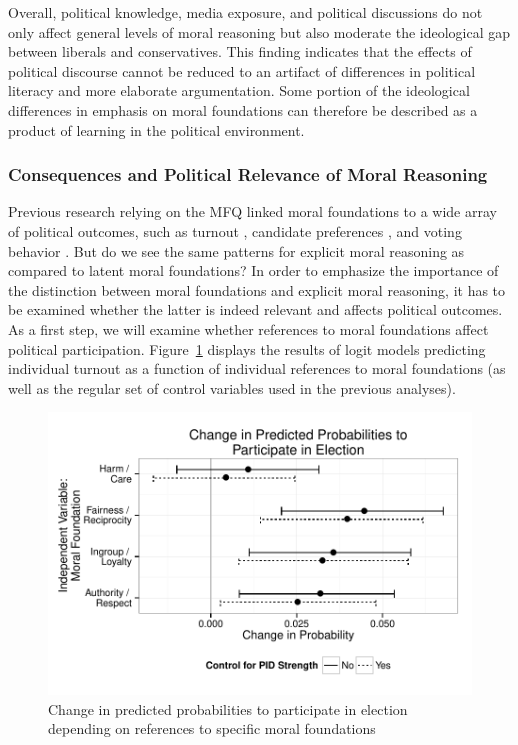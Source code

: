 \documentclass[12pt]{article}
\begin{document}
Overall, political knowledge, media exposure, and political discussions do not only affect general levels of moral reasoning but also moderate the ideological gap between liberals and conservatives. This finding indicates that the effects of political discourse cannot be reduced to an artifact of differences in political literacy and more elaborate argumentation. Some portion of the ideological differences in emphasis on moral foundations can therefore be described as a product of learning in the political environment.


\subsubsection{Consequences and Political Relevance of Moral Reasoning}

Previous research relying on the MFQ linked moral foundations to a wide array of political outcomes, such as turnout \citep{johnson2014ideology}, candidate preferences \citep{iyer2010beyond}, and voting behavior \citep{franks2015using}. But do we see the same patterns for explicit moral reasoning as compared to latent moral foundations? In order to emphasize the importance of the distinction between moral foundations and explicit moral reasoning, it has to be examined whether the latter is indeed relevant and affects political outcomes. As a first step, we will examine whether references to moral foundations affect political participation. Figure~\ref{fig:5turnout} displays the results of logit models predicting individual turnout as a function of individual references to moral foundations (as well as the regular set of control variables used in the previous analyses).

\begin{figure}[h]\centering
\includegraphics[scale=.9]{../calc/fig/fig5turnout.pdf}
\caption{Change in predicted probabilities to participate in election depending on references to specific moral foundations}\label{fig:5turnout}
\end{figure}
\end{document}

